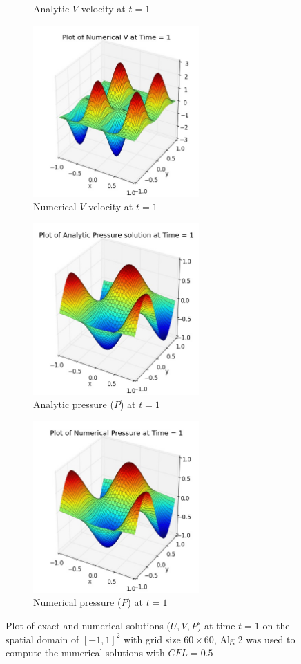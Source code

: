 \begin{figure}[H]
\begin{subfigure}[t]{2.5in}
		\caption{Analytic $V$ velocity at $t=1$}\label{fig:6.1c}
	\end{subfigure}
	\quad
	\begin{subfigure}[t]{2.5in}
		\centering
		\includegraphics[width=2.5in]{figures/Pm1a_pf2_vf_t_1_grid_60 - Copy.jpg}
		\caption{Numerical $V$ velocity at $t=1$}\label{fig:6.1d}
	\end{subfigure}
	\quad	
	\begin{subfigure}[t]{2.5in}
		\centering
		\includegraphics[width=2.5in]{figures/Pm1a_pf2_P_exact_t_1_grid_60 - Copy.jpg}
		\caption{Analytic pressure ($P$) at $t=1$}\label{fig:6.1e}
	\end{subfigure}
	\quad	
	\begin{subfigure}[t]{2.5in}
		\centering
		\includegraphics[width=2.5in]{figures/Pm1a_pf2_pf_t_1_grid_60 - Copy.jpg}
		\caption{Numerical pressure ($P$) at $t=1$}\label{fig:6.1f}
	\end{subfigure}
	\caption{Plot of exact and numerical solutions ($U,V,P$) at time $t=1$ on the spatial domain of $[-1,1]^2$ with grid size $60 \times 60$, Alg 2 was used to compute the numerical solutions with $CFL=0.5$}\label{fig:6.1}
\end{figure}

